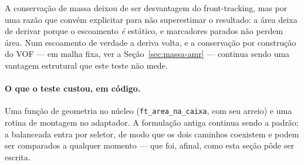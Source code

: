 A conserva\c{c}\~ao de massa deixou de ser desvantagem do front-tracking, mas por
uma raz\~ao que convém explicitar para n\~ao superestimar o resultado: a \'area
deixa de derivar porque o escoamento \emph{\'e} est\'atico, e marcadores parados
n\~ao perdem \'area. Num escoamento de verdade a deriva volta, e a
conserva\c{c}\~ao por constru\c{c}\~ao do VOF --- em malha fixa, ver a
Se\c{c}\~ao~\ref{sec:massa-amr} --- continua sendo uma vantagem
estrutural que este teste n\~ao mede.

\paragraph{O que o teste custou, em c\'odigo.} Uma fun\c{c}\~ao de geometria no
n\'ucleo (\texttt{ft\_area\_na\_caixa}, com seu arreio) e uma rotina de montagem
no adaptador. A formula\c{c}\~ao antiga continua sendo a padr\~ao; a balanceada
entra por seletor, de modo que os dois caminhos coexistem e podem ser comparados
a qualquer momento --- que foi, afinal, como esta se\c{c}\~ao p\^ode ser escrita.
